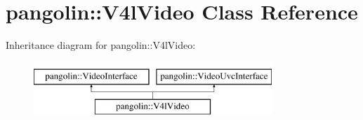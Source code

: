 \hypertarget{classpangolin_1_1_v4l_video}{}\section{pangolin\+:\+:V4l\+Video Class Reference}
\label{classpangolin_1_1_v4l_video}
Inheritance diagram for pangolin\+:\+:V4l\+Video\+:\begin{figure}[H]
\begin{center}
\leavevmode
\includegraphics[height=2.000000cm]{classpangolin_1_1_v4l_video}
\end{center}
\end{figure}
